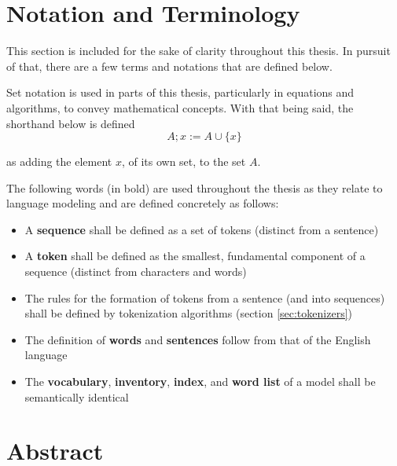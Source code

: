 \documentclass[12pt]{article}
\begin{document}
\section{Notation and Terminology}
This section is included for the sake of clarity throughout this thesis. In pursuit of that, there are a few terms and notations that are defined
below.

Set notation is used in parts of this thesis, particularly in equations and algorithms, to convey mathematical concepts. With that being said, the
shorthand below is defined
\begin{equation*}
    A; x := A \cup \{x\}
\end{equation*}

\noindent
as adding the element $x$, of its own set, to the set $A$.

The following words (in bold) are used throughout the thesis as they relate to language modeling and are defined concretely as follows:
\begin{itemize}
    \item A \textbf{sequence} shall be defined as a set of tokens (distinct from a sentence)
    \item A \textbf{token} shall be defined as the smallest, fundamental component of a sequence (distinct from characters and words)
    \item The rules for the formation of tokens from a sentence (and into sequences) shall be defined by tokenization algorithms (section
          \ref{sec:tokenizers})
    \item The definition of \textbf{words} and \textbf{sentences} follow from that of the English language
    \item The \textbf{vocabulary}, \textbf{inventory}, \textbf{index}, and \textbf{word list} of a model shall be semantically identical
\end{itemize}
\newpage

\section{Abstract}\label{sec:abstract}
\end{document}

